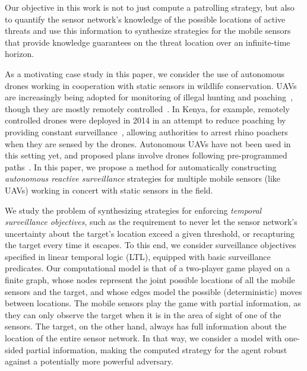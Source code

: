 Our objective in this work  is not to just compute a patrolling strategy, but also to quantify the sensor network's knowledge of the possible locations of active threats and use this information to synthesize strategies for the mobile sensors that provide knowledge guarantees on the threat location over an infinite-time horizon.

As a motivating case study in this paper, we consider the use of autonomous drones working in cooperation with static sensors in wildlife conservation. UAVs are increasingly being adopted for monitoring of illegal hunting and poaching~\cite{schiffman2014drones}, though they are mostly remotely controlled~\cite{mulero2014remotely}. In Kenya, for example, remotely controlled drones were deployed in 2014 in an attempt to reduce poaching  by providing constant surveillance~\cite{Kenya}, allowing authorities to arrest rhino poachers when they are sensed by the drones. Autonomous UAVs  have not been used in this setting yet, and proposed plans involve drones following pre-programmed paths~\cite{Koh12}. In this paper, we propose a method for automatically constructing  \emph{autonomous reactive surveillance} strategies for multiple mobile sensors (like UAVs) working in concert with static sensors in the field. 

We study the problem of synthesizing strategies for enforcing \emph{temporal surveillance objectives}, such as the requirement to never let the sensor network's uncertainty about the target's location exceed a given threshold, or recapturing the target every time it escapes. To this end, we consider surveillance objectives specified in linear temporal logic (LTL), equipped with basic surveillance predicates. Our computational model is that of a two-player game played on a finite graph, whose nodes represent the joint possible locations of all the mobile sensors and the target, and whose edges model the possible (deterministic) moves between locations. The mobile sensors play the game with partial information, as they can only observe the target when  it is in the area of sight of one of the sensors. The target, on the other hand, always has full information about the location of the entire sensor network. In that way, we consider a model with one-sided partial information, making the computed strategy for the agent robust against a potentially more powerful adversary.


